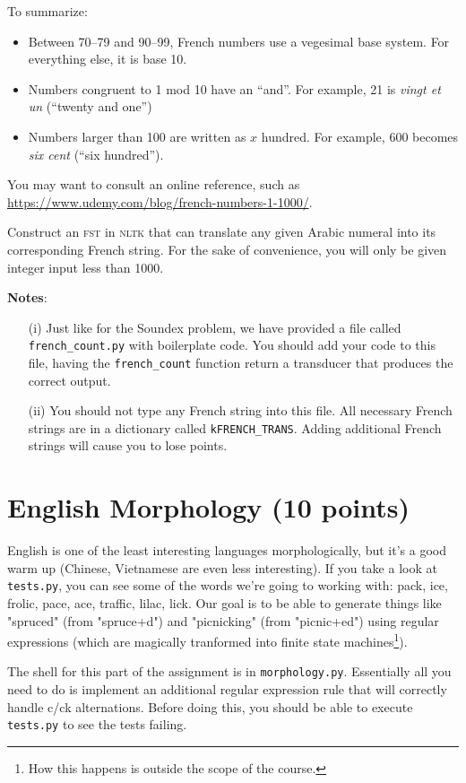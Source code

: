 \documentclass[11pt]{article}
\begin{document}
\noindent To summarize:
\begin{itemize}
\item Between 70--79 and 90--99, French numbers use a
vegesimal base system.  For everything else, it is base 10.
\item Numbers congruent to 1 mod 10 have an ``and''.  For example, 21
  is \textit{vingt et un} (``twenty and one'')
\item Numbers larger than 100 are written as $x$ hundred.  For
  example, 600 becomes \textit{six cent} (``six hundred'').
\end{itemize}

You may want to consult an online reference, such as \url{https://www.udemy.com/blog/french-numbers-1-1000/}.

Construct an \textsc{fst} in \textsc{nltk} that can translate any
given Arabic numeral into its corresponding French string. For the
sake of convenience, you will only be given integer input less than
1000.


\noindent \textbf{Notes}:
\begin{itemize}
	\item[(i)]  Just like for the Soundex problem, we have provided a file
          called \texttt{french\_count.py} with boilerplate code. You
          should add your code to this file, having the
          \texttt{french\_count} function return a transducer that
          produces the correct output.
	\item[(ii)] You should not type any French string into this
          file.  All necessary French strings are in a dictionary
          called \texttt{kFRENCH\_TRANS}.  Adding additional French
          strings will cause you to lose points.
\end{itemize}

\section*{English Morphology (10 points)}

English is one of the least interesting languages morphologically, but
it's a good warm up (Chinese, Vietnamese are even less
interesting). If you take a look at \texttt{tests.py}, you can see
some of the words we're going to working with: pack, ice, frolic,
pace, ace, traffic, lilac, lick.  Our goal is to be able to generate
things like "spruced" (from "spruce+d") and "picnicking" (from
"picnic+ed") using regular expressions (which are magically tranformed
into finite state machines\footnote{How this happens is outside the
  scope of the course.}).

The shell for this part of the assignment is in
\texttt{morphology.py}. Essentially all you need to do is implement an
additional regular expression rule that will correctly handle c/ck
alternations. Before doing this, you should be able to execute
\texttt{tests.py} to see the tests failing.
\end{document}
